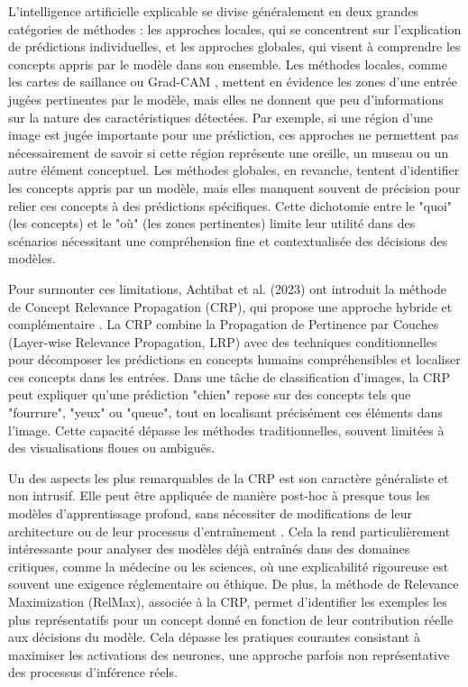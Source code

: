 \documentclass[runningheads]{llncs}
\begin{document}
L'intelligence artificielle explicable se divise généralement en deux grandes catégories de méthodes : les approches locales, qui se concentrent sur l'explication de prédictions individuelles, et les approches globales, qui visent à comprendre les concepts appris par le modèle dans son ensemble. Les méthodes locales, comme les cartes de saillance ou Grad-CAM \autocite{Selvaraju_2019}, mettent en évidence les zones d'une entrée jugées pertinentes par le modèle, mais elles ne donnent que peu d'informations sur la nature des caractéristiques détectées. Par exemple, si une région d'une image est jugée importante pour une prédiction, ces approches ne permettent pas nécessairement de savoir si cette région représente une oreille, un museau ou un autre élément conceptuel. Les méthodes globales, en revanche, tentent d'identifier les concepts appris par un modèle, mais elles manquent souvent de précision pour relier ces concepts à des prédictions spécifiques. Cette dichotomie entre le "quoi" (les concepts) et le "où" (les zones pertinentes) limite leur utilité dans des scénarios nécessitant une compréhension fine et contextualisée des décisions des modèles.

Pour surmonter ces limitations, Achtibat et al. (2023) ont introduit la méthode de Concept Relevance Propagation (CRP), qui propose une approche hybride et complémentaire \autocite{Achtibat2023}. La CRP combine la Propagation de Pertinence par Couches (Layer-wise Relevance Propagation, LRP) avec des techniques conditionnelles pour décomposer les prédictions en concepts humains compréhensibles et localiser ces concepts dans les entrées. Dans une tâche de classification d'images, la CRP peut expliquer qu'une prédiction "chien" repose sur des concepts tels que "fourrure", "yeux" ou "queue", tout en localisant précisément ces éléments dans l'image. Cette capacité dépasse les méthodes traditionnelles, souvent limitées à des visualisations floues ou ambiguës.

Un des aspects les plus remarquables de la CRP est son caractère généraliste et non intrusif. Elle peut être appliquée de manière post-hoc à presque tous les modèles d'apprentissage profond, sans nécessiter de modifications de leur architecture ou de leur processus d'entraînement \autocite{Achtibat2023}. Cela la rend particulièrement intéressante pour analyser des modèles déjà entraînés dans des domaines critiques, comme la médecine ou les sciences, où une explicabilité rigoureuse est souvent une exigence réglementaire ou éthique. De plus, la méthode de Relevance Maximization (RelMax), associée à la CRP, permet d'identifier les exemples les plus représentatifs pour un concept donné en fonction de leur contribution réelle aux décisions du modèle. Cela dépasse les pratiques courantes consistant à maximiser les activations des neurones, une approche parfois non représentative des processus d'inférence réels. 
\end{document}
